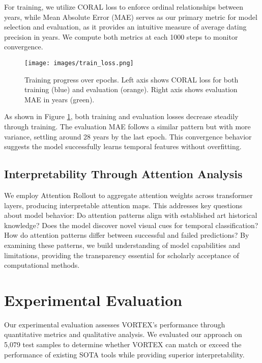\documentclass[10pt,twocolumn,letterpaper]{article}
\begin{document}
For training, we utilize CORAL loss to enforce ordinal relationships between years, while Mean Absolute Error (MAE) serves as our primary metric for model selection and evaluation, as it provides an intuitive measure of average dating precision in years. We compute both metrics at each 1000 steps to monitor convergence.

\begin{figure}[h]
    \centering
    \texttt{[image: images/train\_loss.png]}
    \caption{Training progress over epochs. Left axis shows CORAL loss for both training (blue) and evaluation (orange). Right axis shows evaluation MAE in years (green).}
    \label{fig:training_curves}
\end{figure}

As shown in Figure \ref{fig:training_curves}, both training and evaluation losses decrease steadily through training. The evaluation MAE follows a similar pattern but with more variance, settling around 28 years by the last epoch. This convergence behavior suggests the model successfully learns temporal features without overfitting.

\subsection{Interpretability Through Attention Analysis}

We employ Attention Rollout \cite{Abnar20AttentionRollout} to aggregate attention weights across transformer layers, producing interpretable attention maps. This addresses key questions about model behavior: Do attention patterns align with established art historical knowledge? Does the model discover novel visual cues for temporal classification? How do attention patterns differ between successful and failed predictions? By examining these patterns, we build understanding of model capabilities and limitations, providing the transparency essential for scholarly acceptance of computational methods.

\section{Experimental Evaluation}

Our experimental evaluation assesses VORTEX's performance through quantitative metrics and qualitative analysis. We evaluated our approach on 5,079 test samples to determine whether VORTEX can match or exceed the performance of existing SOTA tools while providing superior interpretability.
\end{document}
